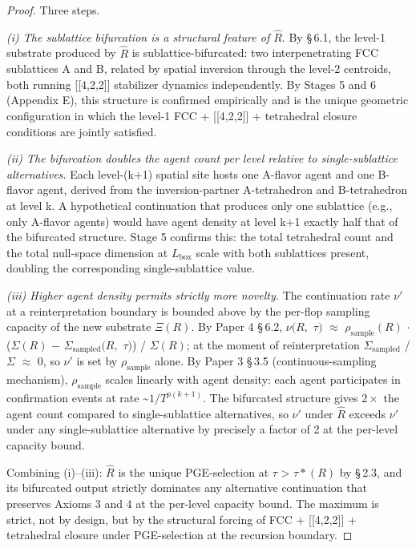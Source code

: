 \documentclass[11pt,oneside]{report}
\theoremstyle{definition}
\theoremstyle{remark}
\begin{document}
\begin{proof}
Three steps.

\emph{(i) The sublattice bifurcation is a structural feature of \ensuremath{\hat{R}.}} By
\S\,6.1, the level-1 substrate produced by \ensuremath{\hat{R}} is sublattice-bifurcated: two
interpenetrating FCC sublattices A and B, related by spatial inversion
through the level-2 centroids, both running [[4,2,2]] stabilizer
dynamics independently. By Stages 5 and 6 (Appendix E), this structure
is confirmed empirically and is the unique geometric configuration in
which the level-1 FCC + [[4,2,2]] + tetrahedral closure
conditions are jointly satisfied.

\emph{(ii) The bifurcation doubles the agent count per level relative to
single-sublattice alternatives.} Each level-(k+1) spatial site hosts one
A-flavor agent and one B-flavor agent, derived from the
inversion-partner A-tetrahedron and B-tetrahedron at level k. A
hypothetical continuation that produces only one sublattice (e.g., only
A-flavor agents) would have agent density at level k+1 exactly half that
of the bifurcated structure. Stage 5 confirms this: the total
tetrahedral count and the total null-space dimension at \ensuremath{L_{\mathrm{box}}} scale
with both sublattices present, doubling the corresponding
single-sublattice value.

\emph{(iii) Higher agent density permits strictly more novelty.} The
continuation rate \ensuremath{\nu '} at a reinterpretation boundary is bounded above by
the per-flop sampling capacity of the new substrate \ensuremath{\Xi (R).} By Paper 4
\S\,6.2, \ensuremath{\nu (R,} \ensuremath{\tau )} \ensuremath{\approx} \ensuremath{\rho_{\mathrm{sample}}(R)} \ensuremath{\cdot} (\textbar \ensuremath{\Sigma (R)}\textbar{} \ensuremath{-}
\textbar \ensuremath{\Sigma_{\mathrm{sampled}}(R,} \ensuremath{\tau )}\textbar) / \textbar \ensuremath{\Sigma (R)}\textbar; at the
moment of reinterpretation \textbar \ensuremath{\Sigma_{\mathrm{sampled}}}\textbar{} /
\textbar \ensuremath{\Sigma}\textbar{} \ensuremath{\approx} 0, so \ensuremath{\nu '} is set by \ensuremath{\rho_{\mathrm{sample}}} alone. By Paper 3
\S\,3.5 (continuous-sampling mechanism), \ensuremath{\rho_{\mathrm{sample}}} scales linearly with
agent density: each agent participates in confirmation events at rate
\textasciitilde\ensuremath{1/T^{p(k+1)}.} The bifurcated structure gives \ensuremath{2\times} the agent
count compared to single-sublattice alternatives, so \ensuremath{\nu '} under \ensuremath{\hat{R}} exceeds
\ensuremath{\nu '} under any single-sublattice alternative by precisely a factor of 2 at
the per-level capacity bound.

Combining (i)--(iii): \ensuremath{\hat{R}} is the unique PGE-selection at \ensuremath{\tau} \textgreater{}
\ensuremath{\tau *(R)} by \S\,2.3, and its bifurcated output strictly dominates any
alternative continuation that preserves Axioms 3 and 4 at the per-level
capacity bound. The maximum is strict, not by design, but by the
structural forcing of FCC + [[4,2,2]] + tetrahedral closure
under PGE-selection at the recursion boundary.

\end{proof}
\end{document}
